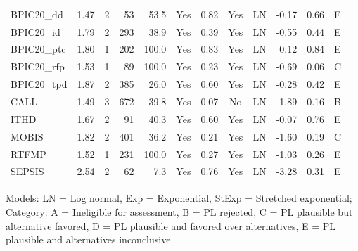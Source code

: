 {\begin{tabular}{lrrrrcrclrrl}
BPIC20\_dd & 1.47 & 2 & 53 & 53.5 & Yes & 0.82 & Yes & LN & -0.17 & 0.66 & \cellcolor[HTML]{19C8C8} E \\
BPIC20\_id & 1.79 & 2 & 293 & 38.9 & Yes & 0.39 & Yes & LN & -0.55 & 0.44 & \cellcolor[HTML]{19C8C8} E \\
BPIC20\_ptc & 1.80 & 1 & 202 & 100.0 & Yes & 0.83 & Yes & LN & 0.12 & 0.84 & \cellcolor[HTML]{19C8C8} E \\
BPIC20\_rfp & 1.53 & 1 & 89 & 100.0 & Yes & 0.23 & Yes & LN & -0.69 & 0.06 & \cellcolor[HTML]{9670BD} C \\
BPIC20\_tpd & 1.87 & 2 & 385 & 26.0 & Yes & 0.60 & Yes & LN & -0.28 & 0.42 & \cellcolor[HTML]{19C8C8} E \\
CALL & 1.49 & 3 & 672 & 39.8 & Yes & 0.07 & No & LN & -1.89 & 0.16 & \cellcolor[HTML]{EA4646} B \\
ITHD & 1.67 & 2 & 91 & 40.3 & Yes & 0.60 & Yes & LN & -0.07 & 0.76 & \cellcolor[HTML]{19C8C8} E \\
MOBIS & 1.82 & 2 & 401 & 36.2 & Yes & 0.21 & Yes & LN & -1.60 & 0.19 & \cellcolor[HTML]{9670BD} C \\
RTFMP & 1.52 & 1 & 231 & 100.0 & Yes & 0.27 & Yes & LN & -1.03 & 0.26 & \cellcolor[HTML]{19C8C8} E \\
SEPSIS & 2.54 & 2 & 62 & 7.3 & Yes & 0.76 & Yes & LN & -3.28 & 0.31 & \cellcolor[HTML]{19C8C8} E \\
\bottomrule
\end{tabular}
}
\begin{center}\footnotesize
Models: LN = Log normal, Exp = Exponential, StExp = Stretched exponential; \quad Category: A = Ineligible for assessment, B = PL rejected, C = PL plausible but alternative favored, D = PL plausible and favored over alternatives, E = PL plausible and alternatives inconclusive.
\end{center}
